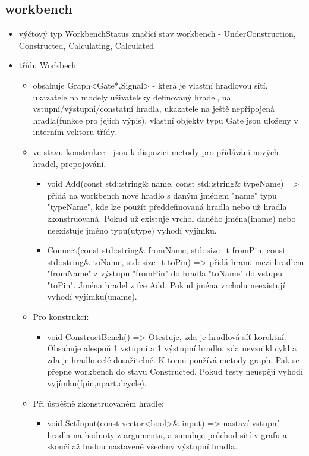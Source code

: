 \documentclass[12pt, oneside]{article}
\begin{document}
\subsection*{workbench}
\begin{itemize}
\item výčtový typ WorkbenchStatus značící stav workbench  -  UnderConstruction, Constructed, Calculating, Calculated
\item třídu Workbech
\begin{itemize} 
\item obsahuje Graph<Gate*,Signal> - která je vlastní hradlovou sítí, ukazatele na modely uživatelsky definovaný hradel, na vstupní/výstupní/constatní hradla, ukazatele na ještě nepřipojená hradla(funkce pro  jejich výpis), vlastní objekty typu Gate jsou uloženy v interním vektoru třídy.
\item ve stavu konstrukce - jsou k dispozici metody pro přidávání  nových hradel, propojování.
\begin{itemize}
\item  void Add(const std::string\& name, const std::string\& typeName) => přidá na workbench nové hradlo s daným jménem  "name" typu "typeName", kde lze použít předdefinovaná hradla nebo už hradla zkonstruovaná. Pokud už existuje vrchol daného jména(iname) nebo neexistuje jméno typu(utype) vyhodí vyjímku. 
\item Connect(const std::string\& fromName, std::size\_t fromPin, const std::string\& toName, std::size\_t toPin) => přidá hranu mezi hradlem "fromName" z výstupu "fromPin" do hradla "toName" do vstupu "toPin". Jména hradel z fce Add. Pokud jména vrcholu neexistují vyhodí vyjímku(uname). 
\end{itemize}  
\item Pro konstrukci:
\begin{itemize} 
\item void ConstructBench() => Otestuje, zda je hradlová síť korektní. Obsahuje alespoň 1 vstupní a 1 výstupní hradlo, zda nevznikl cykl a zda je hradlo celé dosažitelné. K tomu používá metody graph. Pak se přepne workbench do stavu Constructed. Pokud testy neuspějí vyhodí vyjímku(fpin,npart,dcycle).
\end{itemize} 
\item Při úspěšně zkonstruovaném hradle:
\begin{itemize}
\item void SetInput(const vector<bool>\& input) => nastaví vstupní hradla na hodnoty z argumentu, a simuluje průchod sítí v grafu a skončí až budou nastavené všechny výstupní hradla.  

\end{itemize}
\end{itemize}
\end{itemize}
\end{document}
